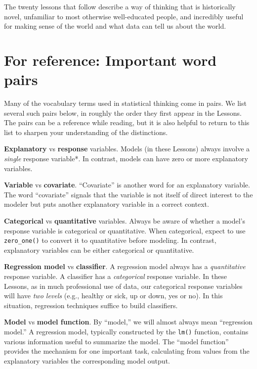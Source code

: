 \documentclass[
  letterpaper,
  DIV=11,
  numbers=noendperiod,
  oneside]{scrreprt}
\begin{document}
The twenty lessons that follow describe a way of thinking that is
historically novel, unfamiliar to most otherwise well-educated people,
and incredibly useful for making sense of the world and what data can
tell us about the world.

\hypertarget{for-reference-important-word-pairs}{%
\section*{For reference: Important word
pairs}\label{for-reference-important-word-pairs}}


Many of the vocabulary terms used in statistical thinking come in pairs.
We list several such pairs below, in roughly the order they first appear
in the Lessons. The pairs can be a reference while reading, but it is
also helpful to return to this list to sharpen your understanding of the
distinctions.

\textbf{Explanatory} vs \textbf{response} variables. Models (in these
Lessons) always involve a \emph{single} response variable*. In contrast,
models can have zero or more explanatory variables.

\textbf{Variable} vs \textbf{covariate}. ``Covariate'' is another word
for an explanatory variable. The word ``covariate'' signals that the
variable is not itself of direct interest to the modeler but puts
another explanatory variable in a correct context.

\textbf{Categorical} vs \textbf{quantitative} variables. Always be aware
of whether a model's response variable is categorical or quantitative.
When categorical, expect to use \texttt{zero\_one()} to convert it to
quantitative before modeling. In contrast, explanatory variables can be
either categorical or quantitative.

\textbf{Regression model} vs \textbf{classifier}. A regression model
always has a \emph{quantitative} response variable. A classifier has a
\emph{categorical} response variable. In these Lessons, as in much
professional use of data, our categorical response variables will have
\emph{two levels} (e.g., healthy or sick, up or down, yes or no). In
this situation, regression techniques suffice to build classifiers.

\textbf{Model} vs \textbf{model function}. By ``model,'' we will almost
always mean ``regression model.'' A regression model, typically
constructed by the \texttt{lm()} function, contains various information
useful to summarize the model. The ``model function'' provides the
mechanism for one important task, calculating from values from the
explanatory variables the corresponding model output.
\end{document}
